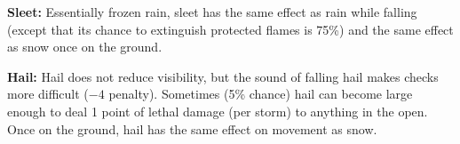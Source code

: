 \textbf{Sleet:} Essentially frozen rain, sleet has the same effect as rain while falling (except that its chance to extinguish protected flames is 75\%) and the same effect as snow once on the ground.

\textbf{Hail:} Hail does not reduce visibility, but the sound of falling hail makes  checks more difficult ($-4$ penalty). Sometimes (5\% chance) hail can become large enough to deal 1 point of lethal damage (per storm) to anything in the open. Once on the ground, hail has the same effect on movement as snow.

